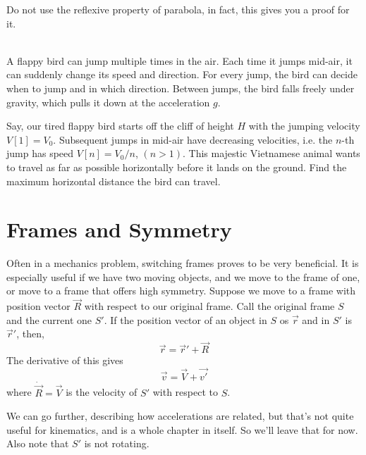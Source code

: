 \begin{exc}
\begin{exercise}[subtitle={Projectiles with Vector, V2.}, points = 3]
            Do not use the reflexive property of parabola, in fact, this gives you a proof for it.
        \end{exercise}

        \begin{exercise}[subtitle={Tired Flappy Bird, OPhO}, points = 4]
            \smallskip
            ~\\
            A flappy bird can jump multiple times in the air. Each time it jumps
            mid-air, it can suddenly change its speed and direction. For every jump, the bird can decide when to jump
            and in which direction. Between jumps, the bird falls freely under gravity, which pulls it down at the
            acceleration $g$. 
            
            Say, our tired flappy bird starts off the cliff of height $H$ with the jumping velocity $V [1] = V_0$.
            Subsequent jumps in mid-air have decreasing velocities, i.e. the $n$-th jump has speed $V [n] = V_0/n$, $(n > 1)$.
            This majestic Vietnamese animal wants to travel as far as possible horizontally before it lands on the
            ground. Find the maximum horizontal distance the bird can travel.
        \end{exercise}
    \end{exc}

    \section{Frames and Symmetry}  
    
    Often in a mechanics problem, switching frames proves to be very beneficial. It is especially useful 
    if we have two moving objects, and we move to the frame of one, or move to a frame that offers high 
    symmetry. Suppose we move to a frame with position vector $\vec{R}$ with respect to our original frame. 
    Call the original frame $S$ and the current one $S'$. If the position vector of an object in $S$ os $\vec{r}$
    and in $S'$ is $\vec{r}'$, then,
    \begin{equation}
        \vec{r} = \vec{r}' + \vec{R}        
    \end{equation}
    The derivative of this gives 
    \begin{equation}
        \vec{v} = \vec{V} + \vec{v'}
    \end{equation}
    where $\dot{\vec{R}} = \vec{V}$ is the velocity of $S'$ with respect to $S$.
    
    We can go further, describing how accelerations are related, but that's not quite useful for kinematics, and 
    is a whole chapter in itself. So we'll leave that for now. Also note that $S'$ is not rotating.

